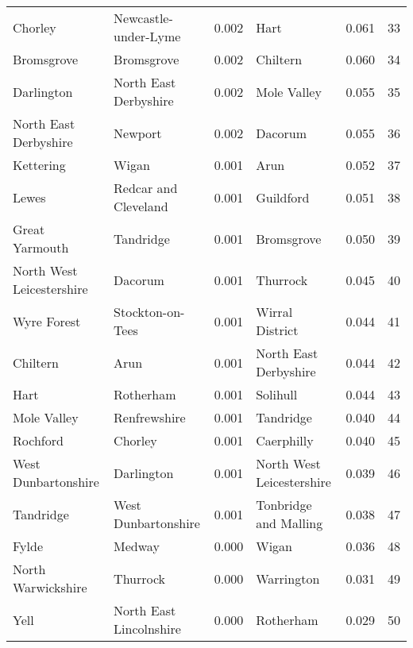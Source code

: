\begin{tabular}{llrlrr}
Chorley                   &       Newcastle-under-Lyme &  0.002 &                       Hart &   0.061 &    33 \\
Bromsgrove                &                 Bromsgrove &  0.002 &                   Chiltern &   0.060 &    34 \\
Darlington                &      North East Derbyshire &  0.002 &                Mole Valley &   0.055 &    35 \\
North East Derbyshire     &                    Newport &  0.002 &                    Dacorum &   0.055 &    36 \\
Kettering                 &                      Wigan &  0.001 &                       Arun &   0.052 &    37 \\
Lewes                     &       Redcar and Cleveland &  0.001 &                  Guildford &   0.051 &    38 \\
Great Yarmouth            &                  Tandridge &  0.001 &                 Bromsgrove &   0.050 &    39 \\
North West Leicestershire &                    Dacorum &  0.001 &                   Thurrock &   0.045 &    40 \\
Wyre Forest               &           Stockton-on-Tees &  0.001 &            Wirral District &   0.044 &    41 \\
Chiltern                  &                       Arun &  0.001 &      North East Derbyshire &   0.044 &    42 \\
Hart                      &                  Rotherham &  0.001 &                   Solihull &   0.044 &    43 \\
Mole Valley               &               Renfrewshire &  0.001 &                  Tandridge &   0.040 &    44 \\
Rochford                  &                    Chorley &  0.001 &                 Caerphilly &   0.040 &    45 \\
West Dunbartonshire       &                 Darlington &  0.001 &  North West Leicestershire &   0.039 &    46 \\
Tandridge                 &        West Dunbartonshire &  0.001 &      Tonbridge and Malling &   0.038 &    47 \\
Fylde                     &                     Medway &  0.000 &                      Wigan &   0.036 &    48 \\
North Warwickshire        &                   Thurrock &  0.000 &                 Warrington &   0.031 &    49 \\
Yell                      &    North East Lincolnshire &  0.000 &                  Rotherham &   0.029 &    50 \\
\bottomrule
\end{tabular}
